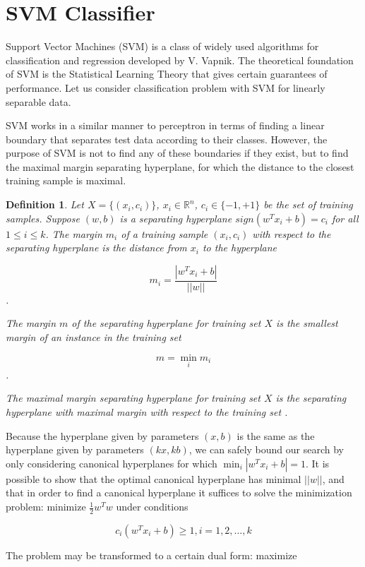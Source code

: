 \documentclass[12pt]{report}
\newcommand{\re}{\mathbb{R}}
\newtheorem{definition}{Definition}[section]
\begin{document}
\newpage

\section{SVM Classifier}

Support Vector Machines (SVM) is a class of widely used algorithms for classification and regression developed by V. Vapnik. The theoretical foundation of SVM is the Statistical Learning Theory that gives certain guarantees of performance. Let us consider classification problem with SVM for linearly separable data.

SVM works in a similar manner to perceptron in terms of finding a linear boundary that separates test data according to their classes. However, the purpose of SVM is not to find any of these boundaries if they exist, but to find the maximal margin separating hyperplane, for which the distance to the closest training sample is maximal.

\begin{definition}
	Let $X = \{(x_i, c_i)\}$, $x_i \in \re^n$, $c_i \in \{-1, +1\}$ be the set of training samples. Suppose $(w, b)$ is a separating hyperplane $sign(w^T x_i + b) = c_i$ for all $1 \leq i \leq k$. The margin $m_i$ of a training sample $(x_i, c_i)$ with respect to the separating hyperplane is the distance from $x_i$ to the hyperplane
	
	$$m_i = \dfrac{|w^T x_i + b|}{||w||}$$.
	
	The margin $m$ of the separating hyperplane for training set $X$ is the smallest margin of an instance in the training set
	
	$$m = \min_i m_i$$.
	
	The maximal margin separating hyperplane for training set $X$ is the separating hyperplane with maximal margin with respect to the training set \cite{Tretyakov}.
\end{definition}

Because the hyperplane given by parameters $(x, b)$ is the same as the hyperplane given by parameters $(kx, kb)$, we can safely bound our search by only considering canonical hyperplanes for which $\min_i |w^T x_i + b| = 1$. It is possible to show that the optimal canonical hyperplane has minimal $||w||$, and that in order to find a canonical hyperplane it suffices to solve the minimization problem: minimize $\frac{1}{2} w^T w$ under conditions

$$c_i(w^T x_i + b) \ge 1, i = 1, 2, \dots, k$$

The problem may be transformed to a certain dual form: maximize
\end{document}
